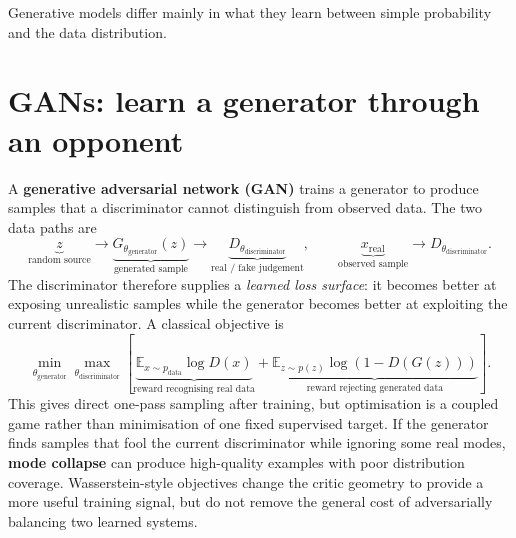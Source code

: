 \begin{calloutmemoryhook}
Generative models differ mainly in what they learn between simple probability and the data distribution.
\end{calloutmemoryhook}

\section{GANs: learn a generator through an opponent}

A \textbf{generative adversarial network (GAN)} trains a generator to produce samples that a discriminator cannot distinguish from observed data.
The two data paths are
\[
\underbrace{z}_{\text{random source}}
\rightarrow
\underbrace{G_{\theta_{\text{generator}}}(z)}_{\text{generated sample}}
\rightarrow
\underbrace{D_{\theta_{\text{discriminator}}}}_{\text{real / fake judgement}},
\qquad
\underbrace{x_{\text{real}}}_{\text{observed sample}}
\rightarrow
D_{\theta_{\text{discriminator}}}.
\]
The discriminator therefore supplies a \emph{learned loss surface}: it becomes better at exposing unrealistic samples while the generator becomes better at exploiting the current discriminator.
A classical objective is
\[
\min_{\theta_{\text{generator}}}\max_{\theta_{\text{discriminator}}}
\left[
\underbrace{\mathbb E_{x\sim p_{\text{data}}}\log D(x)}_{\text{reward recognising real data}}
+
\underbrace{\mathbb E_{z\sim p(z)}\log\!\left(1-D(G(z))\right)}_{\text{reward rejecting generated data}}
\right].
\]
This gives direct one-pass sampling after training, but optimisation is a coupled game rather than minimisation of one fixed supervised target.
If the generator finds samples that fool the current discriminator while ignoring some real modes, \textbf{mode collapse} can produce high-quality examples with poor distribution coverage.
Wasserstein-style objectives change the critic geometry to provide a more useful training signal, but do not remove the general cost of adversarially balancing two learned systems.

